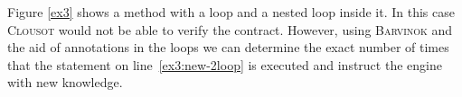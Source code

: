 Figure \ref{ex3} shows a method with a loop and a nested loop inside it. In this case \textsc{Clousot} would not be able to verify the contract. 
However, using  \textsc{Barvinok} and the aid of   annotations in the loops we can determine the exact number of times that the  statement on line~\ref{ex3:new-2loop} is executed and instruct the engine with new knowledge.



